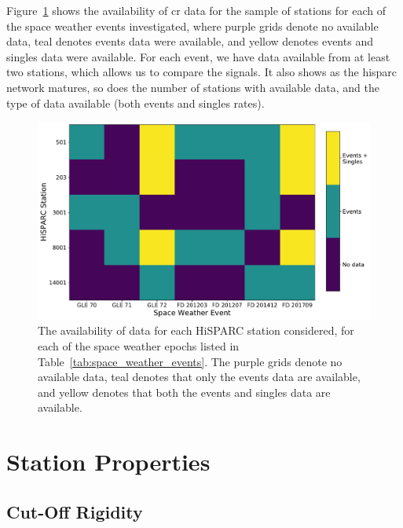 Figure~\ref{fig:HS_data_availability} shows the availability of \gls{cr} data for the sample of stations for each of the space weather events investigated, where purple grids denote no available data, teal denotes events data were available, and yellow denotes events and singles data were available. For each event, we have data available from at least two stations, which allows us to compare the signals. It also shows as the \gls{hisparc} network matures, so does the number of stations with available data, and the type of data available (both events and singles rates).

\begin{figure}[ht!]
	\centering
	\includegraphics[width=0.9\columnwidth]{HS_data_availaviblity_map.pdf}
	\caption{The availability of data for each HiSPARC station considered, for each of the space weather epochs listed in Table~\ref{tab:space_weather_events}. The purple grids denote no available data, teal denotes that only the events data are available, and yellow denotes that both the events and singles data are available.}
	\label{fig:HS_data_availability}
\end{figure}





\section{Station Properties}\label{sec:HS_properties}

\subsection{Cut-Off Rigidity}

